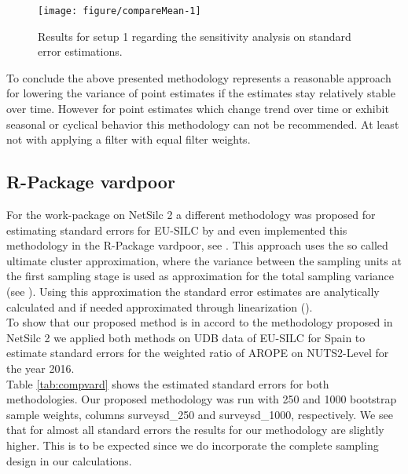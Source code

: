 \documentclass{scrartcl}\usepackage[]{graphicx}\usepackage[]{color}
\makeatletter
\def\maxwidth{ %
  \ifdim\Gin@nat@width>\linewidth
    \linewidth
  \else
    \Gin@nat@width
  \fi
}
\newenvironment{knitrout}{}{} %
\makeatother
\begin{document}
\begin{knitrout}
\color{fgcolor}\begin{figure}
\texttt{[image: figure/compareMean-1]} \caption[Results for setup 1 regarding the sensitivity analysis on standard error estimations]{Results for setup 1 regarding the sensitivity analysis on standard error estimations.}\label{fig:compareMean}
\end{figure}


\end{knitrout}

To conclude the above presented methodology represents a reasonable approach for lowering the variance of point estimates if the estimates stay relatively stable over time. However for point estimates which change trend over time or exhibit seasonal or cyclical behavior this methodology can not be recommended. At least not with applying a filter with equal filter weights.

\subsection{R-Package vardpoor}
For the work-package on NetSilc 2 a different methodology was proposed for estimating standard errors for EU-SILC by \citep{soton416829} and even implemented this methodology in the R-Package vardpoor, see \citep{vardpoor}. This approach uses the so called ultimate cluster approximation, where the variance between the sampling units at the first sampling stage is used as approximation for the total sampling variance (see \citep{saerndal1992model}). Using this approximation the standard error estimates are analytically calculated and if needed approximated through linearization (\citep{devilleClaude}).\\
To show that our proposed method is in accord to the methodology proposed in NetSilc 2 we applied both methods on UDB data of EU-SILC for Spain to estimate standard errors for the weighted ratio of AROPE on NUTS2-Level for the year 2016.\\
Table \ref{tab:compvard} shows the estimated standard errors for both methodologies. Our proposed methodology was run with 250 and 1000 bootstrap sample weights, columns
surveysd\_250 and surveysd\_1000, respectively. We see that for almost all standard errors the results for our methodology are slightly higher. This is to be expected since we do incorporate the complete sampling design in our calculations.
\end{document}
